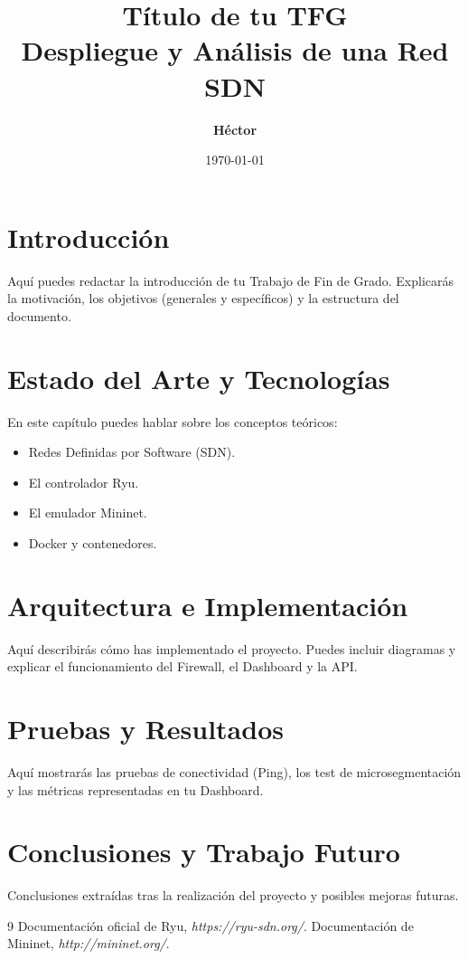 \documentclass[12pt, a4paper]{report}
\title{\Huge\textbf{Título de tu TFG} \\ \vspace{0.5cm} \Large Despliegue y Análisis de una Red SDN}
\author{\textbf{Héctor}}
\date{\vspace{1cm} \today}
\begin{document}
\maketitle

\tableofcontents
\newpage

\chapter{Introducción}
Aquí puedes redactar la introducción de tu Trabajo de Fin de Grado. Explicarás la motivación, los objetivos (generales y específicos) y la estructura del documento.

\chapter{Estado del Arte y Tecnologías}
En este capítulo puedes hablar sobre los conceptos teóricos:
\begin{itemize}
    \item Redes Definidas por Software (SDN).
    \item El controlador Ryu.
    \item El emulador Mininet.
    \item Docker y contenedores.
\end{itemize}

\chapter{Arquitectura e Implementación}
Aquí describirás cómo has implementado el proyecto. Puedes incluir diagramas y explicar el funcionamiento del Firewall, el Dashboard y la API.

\chapter{Pruebas y Resultados}
Aquí mostrarás las pruebas de conectividad (Ping), los test de microsegmentación y las métricas representadas en tu Dashboard.

\chapter{Conclusiones y Trabajo Futuro}
Conclusiones extraídas tras la realización del proyecto y posibles mejoras futuras.

\begin{thebibliography}{9}
Documentación oficial de Ryu, \textit{https://ryu-sdn.org/}.
Documentación de Mininet, \textit{http://mininet.org/}.
\end{thebibliography}
\end{document}
